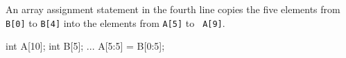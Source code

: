 


An array assignment statement in the fourth line copies the five elements
from {\tt B[0]} to {\tt B[4]} into the elements from {\tt A[5]} to {\tt
A[9]}.

\hspace{\hsize}
\begin{XCexample}
int A[10];
int B[5];
    ...
A[5:5] = B[0:5]; 
\end{XCexample}




